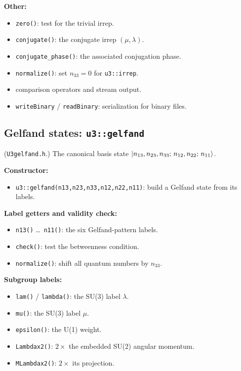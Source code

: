 \documentclass[aps,onecolumn,10pt,superscriptaddress,floatfix,nofootinbib]{revtex4}
\begin{document}
\textbf{Other:}
\begin{itemize}
    \item \verb|zero()|: test for the trivial irrep.
    \item \verb|conjugate()|: the conjugate irrep $(\mu,\lambda)$.
    \item \verb|conjugate_phase()|: the associated conjugation phase.
    \item \verb|normalize()|: set $n_{33}=0$ for \verb|u3::irrep|.
    \item comparison operators and stream output.
    \item \verb|writeBinary| / \verb|readBinary|: serialization for binary files.
\end{itemize}

\subsection{Gelfand states: \texttt{u3::gelfand}}
(\verb|U3gelfand.h|.) The canonical basis state $\ket{n_{13},n_{23},n_{33};\,n_{12},n_{22};\,n_{11}}$.

\textbf{Constructor:}
\begin{itemize}
    \item \verb|u3::gelfand(n13,n23,n33,n12,n22,n11)|: build a Gelfand state from its labels.
\end{itemize}

\textbf{Label getters and validity check:}
\begin{itemize}
    \item \verb|n13()| \dots\ \verb|n11()|: the six Gelfand-pattern labels.
    \item \verb|check()|: test the betweenness condition.
    \item \verb|normalize()|: shift all quantum numbers by $n_{33}$.
\end{itemize}

\textbf{Subgroup labels:}
\begin{itemize}
    \item \verb|lam()| / \verb|lambda()|: the SU(3) label $\lambda$.
    \item \verb|mu()|: the SU(3) label $\mu$.
    \item \verb|epsilon()|: the U(1) weight.
    \item \verb|Lambdax2()|: $2\times$ the embedded SU(2) angular momentum.
    \item \verb|MLambdax2()|: $2\times$ its projection.
\end{itemize}
\end{document}
